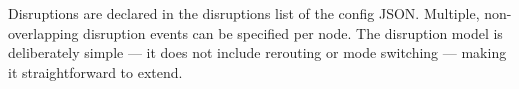 Disruptions are declared in the disruptions list of the config JSON.
Multiple, non-overlapping disruption events can be specified per node.  The
disruption model is deliberately simple — it does not include rerouting or
mode switching — making it straightforward to extend.





